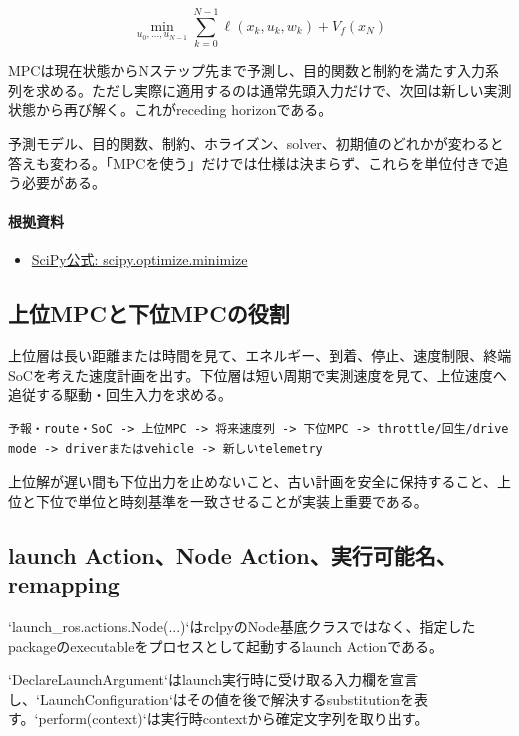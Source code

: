 \documentclass[a4paper,11pt]{article}
\begin{document}
\[
\min_{u_0,\ldots,u_{N-1}} \sum_{k=0}^{N-1}\ell(x_k,u_k,w_k)+V_f(x_N)
\]

MPCは現在状態からNステップ先まで予測し、目的関数と制約を満たす入力系列を求める。ただし実際に適用するのは通常先頭入力だけで、次回は新しい実測状態から再び解く。これがreceding horizonである。


予測モデル、目的関数、制約、ホライズン、solver、初期値のどれかが変わると答えも変わる。「MPCを使う」だけでは仕様は決まらず、これらを単位付きで追う必要がある。

\paragraph{根拠資料}
\begin{itemize}[leftmargin=1.6em]
\item \href{https://docs.scipy.org/doc/scipy/reference/generated/scipy.optimize.minimize.html}{SciPy公式: scipy.optimize.minimize}
\end{itemize}

\subsection{上位MPCと下位MPCの役割}
上位層は長い距離または時間を見て、エネルギー、到着、停止、速度制限、終端SoCを考えた速度計画を出す。下位層は短い周期で実測速度を見て、上位速度へ追従する駆動・回生入力を求める。


\begin{lstlisting}
予報・route・SoC -> 上位MPC -> 将来速度列 -> 下位MPC -> throttle/回生/drive mode -> driverまたはvehicle -> 新しいtelemetry
\end{lstlisting}


上位解が遅い間も下位出力を止めないこと、古い計画を安全に保持すること、上位と下位で単位と時刻基準を一致させることが実装上重要である。



\subsection{launch Action、Node Action、実行可能名、remapping}
`launch\_ros.actions.Node(...)`はrclpyのNode基底クラスではなく、指定したpackageのexecutableをプロセスとして起動するlaunch Actionである。


`DeclareLaunchArgument`はlaunch実行時に受け取る入力欄を宣言し、`LaunchConfiguration`はその値を後で解決するsubstitutionを表す。`perform(context)`は実行時contextから確定文字列を取り出す。
\end{document}
